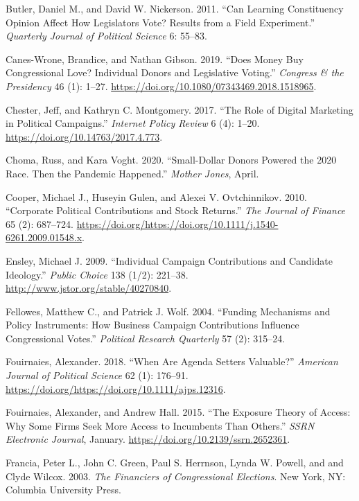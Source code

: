 \documentclass[12pt,]{article}
\begin{document}
\leavevmode\hypertarget{ref-butler2011}{}%
Butler, Daniel M., and David W. Nickerson. 2011. ``Can Learning
Constituency Opinion Affect How Legislators Vote? Results from a Field
Experiment.'' \emph{Quarterly Journal of Political Science} 6: 55--83.

\leavevmode\hypertarget{ref-caneswrone2019}{}%
Canes-Wrone, Brandice, and Nathan Gibson. 2019. ``Does Money Buy
Congressional Love? Individual Donors and Legislative Voting.''
\emph{Congress \& the Presidency} 46 (1): 1--27.
\url{https://doi.org/10.1080/07343469.2018.1518965}.

\leavevmode\hypertarget{ref-chester2017}{}%
Chester, Jeff, and Kathryn C. Montgomery. 2017. ``The Role of Digital
Marketing in Political Campaigns.'' \emph{Internet Policy Review} 6 (4):
1--20. \url{https://doi.org/10.14763/2017.4.773}.

\leavevmode\hypertarget{ref-choma2020}{}%
Choma, Russ, and Kara Voght. 2020. ``Small-Dollar Donors Powered the
2020 Race. Then the Pandemic Happened.'' \emph{Mother Jones}, April.

\leavevmode\hypertarget{ref-cooper2010}{}%
Cooper, Michael J., Huseyin Gulen, and Alexei V. Ovtchinnikov. 2010.
``Corporate Political Contributions and Stock Returns.'' \emph{The
Journal of Finance} 65 (2): 687--724.
\url{https://doi.org/https://doi.org/10.1111/j.1540-6261.2009.01548.x}.

\leavevmode\hypertarget{ref-ensley2009}{}%
Ensley, Michael J. 2009. ``Individual Campaign Contributions and
Candidate Ideology.'' \emph{Public Choice} 138 (1/2): 221--38.
\url{http://www.jstor.org/stable/40270840}.

\leavevmode\hypertarget{ref-fellowes2004}{}%
Fellowes, Matthew C., and Patrick J. Wolf. 2004. ``Funding Mechanisms
and Policy Instruments: How Business Campaign Contributions Influence
Congressional Votes.'' \emph{Political Research Quarterly} 57 (2):
315--24.

\leavevmode\hypertarget{ref-fouirnaies2018}{}%
Fouirnaies, Alexander. 2018. ``When Are Agenda Setters Valuable?''
\emph{American Journal of Political Science} 62 (1): 176--91.
\url{https://doi.org/https://doi.org/10.1111/ajps.12316}.

\leavevmode\hypertarget{ref-fouirnaies2015}{}%
Fouirnaies, Alexander, and Andrew Hall. 2015. ``The Exposure Theory of
Access: Why Some Firms Seek More Access to Incumbents Than Others.''
\emph{SSRN Electronic Journal}, January.
\url{https://doi.org/10.2139/ssrn.2652361}.

\leavevmode\hypertarget{ref-francia2003}{}%
Francia, Peter L., John C. Green, Paul S. Herrnson, Lynda W. Powell, and
and Clyde Wilcox. 2003. \emph{The Financiers of Congressional
Elections}. New York, NY: Columbia University Press.
\end{document}

